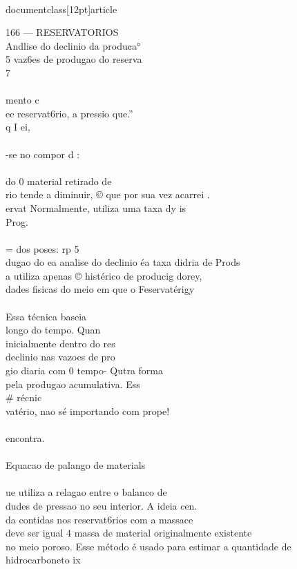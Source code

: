 \\documentclass[12pt]{article}
\begin{document}
166 — RESERVATORIOS\\
Andlise do declinio da produ¢a°\\
5 vaz6es de produgao do reserva\\
7\\
\\
mento c\\
ee reservat6rio, a pressio que.”\\
q I ei,\\
\\
-se no compor d :\\
\\
do 0 material retirado de\\
rio tende a diminuir, © que por sua vez acarrei .\\
ervat Normalmente, utiliza uma taxa dy is\\
Prog.\\
\\
= dos poses: rp 5\\
dugao do ea analise do declinio éa taxa didria de Prods\\
a utiliza apenas © histérico de producig dorey,\\
dades fisicas do meio em que o Feservatérigy\\
\\
Essa técnica baseia\\
longo do tempo. Quan\\
inicialmente dentro do res\\
declinio nas vazoes de pro\\
gio diaria com 0 tempo- Qutra forma\\
pela produgao acumulativa. Ess\\# récnic\\
vatério, nao sé importando com prope!\\
\\
encontra.\\
\\
Equacao de palango de materials\\
\\
ue utiliza a relagao entre o balanco de\\
dudes de pressao no seu interior. A ideia cen.\\
da contidas nos reservat6rios com a massace\\
deve ser igual 4 massa de material originalmente existente\\
no meio poroso. Esse método é usado para estimar a quantidade de hidrocarboneto ix\\
\end{document}
